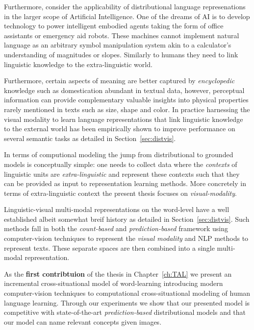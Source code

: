 Furthermore, consider the applicability of distributional language represenations in the larger scope of Artificial 
Intelligence. One of the dreams of AI is to develop technology to power intelligent embodied agents
taking the form of office assistants or emergency aid robots. These machines cannot implement natural
language as an arbitrary symbol manipulation system akin to a calculator's understanding of 
magnitudes or slopes. 
Similarly to humans they need
to link linguistic knowledge to the extra-linguistic world. 

Furthermore, certain aspects of meaning are better captured by \emph{encyclopedic}
knowledge such as domestication abundant in textual data, however, perceptual information
can provide complementary valuable insights into physical properties rarely mentioned in texts such as size,
shape and color. In practice harnessing the visual modality to learn language
representations that link linguistic knowledge
to the external world  has been empirically shown to improve performance on several semantic tasks as
detailed in Section~\ref{sec:distvis}.


In terms of computional modeling the jump from 
distributional to grounded models is conceptually simple: one needs to collect data where
the \emph{contexts} of linguistic units are \emph{extra-linguistic} and represent these contexts such
that they can be provided as input to representation learning methods.
More concretely in terms of extra-linguistic context the present thesis focuses on \emph{visual-modality}.

Linguistic-visual multi-modal representations on the word-level have a well established albeit somewhat breif history as
detailed in Section~\ref{sec:distvis}. Such methods fall in both the \emph{count-based}
and \emph{prediction-based} framework using computer-vision techniques to represent the \emph{visual
modality} and NLP methods to represent texts. These separate spaces are then combined into a single multi-modal representation.

As the \textbf{first contribtuion} of the thesis in Chapter~\ref{ch:TAL} we present an incremental cross-situational
model of word-learning introducing modern computer-vision techniques to computational cross-situational modeling of 
human language learning. Through our experiments we show that our presented model is competitive with state-of-the-art
\emph{prediction-based} distributional models and that our model can name relevant concepts given images.

